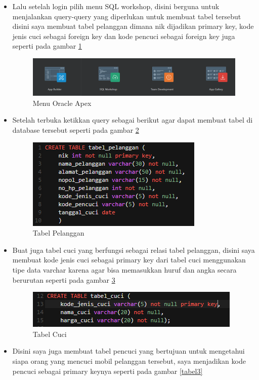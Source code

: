 \documentclass{article}
\begin{document}
\begin{itemize}
\item Lalu setelah login pilih menu SQL workshop, disini berguna untuk menjalankan query-query yang diperlukan untuk membuat tabel tersebut disini saya membuat tabel pelanggan dimana nik dijadikan primary key, kode jenis cuci sebagai foreign key dan kode pencuci sebagai foreign key juga seperti pada gambar \ref{menu}
\begin{figure}[!htbp]
    \centering
    \includegraphics[scale=0.5]{figures/11.PNG}
    \caption{Menu Oracle Apex}
    \label{menu}
\end{figure}
\item Setelah terbuka ketikkan query sebagai berikut agar dapat membuat tabel di database tersebut seperti pada gambar \ref{tabel1}
\begin{figure}[!htbp]
    \centering
    \includegraphics[scale=1]{figures/1.PNG}
    \caption{Tabel Pelanggan}
    \label{tabel1}
\end{figure}
\item Buat juga tabel cuci yang berfungsi sebagai relasi tabel pelanggan, disini saya membuat kode jenis cuci sebagai primary key dari tabel cuci menggunakan tipe data varchar karena agar bisa memasukkan huruf dan angka secara berurutan seperti pada gambar \ref{tabel2}
\begin{figure}[!htbp]
    \centering
    \includegraphics[scale=1]{figures/2.PNG}
    \caption{Tabel Cuci}
    \label{tabel2}
\end{figure}
\item Disini saya juga membuat tabel pencuci yang bertujuan untuk mengetahui siapa orang yang mencuci mobil pelanggan tersebut, saya menjadikan kode pencuci sebagai primary keynya seperti pada gambar \ref{tabel3}

\end{itemize}
\end{document}
